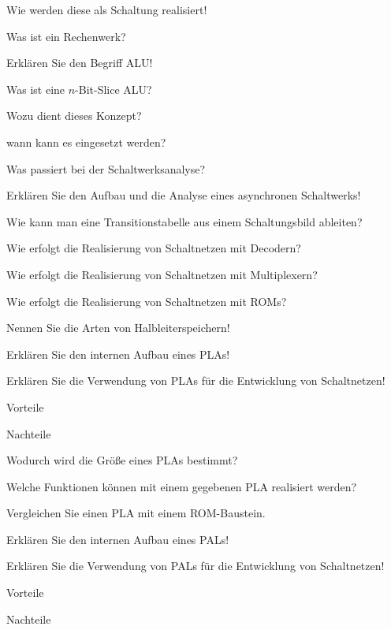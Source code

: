 \documentclass
[
  draft    = true,
  fontsize = 11pt,
  parskip  = half-,
  BCOR     = 0pt,
  DIV      = 11,
  ngerman,
  dvipsnames
]
{scrartcl}
\begin{document}
\begin{mytemize}
\begin{mytemize}
          \item Wie werden diese als Schaltung realisiert!
        \end{mytemize}
  \item Was ist ein Rechenwerk?
  \item Erklären Sie den Begriff ALU!
  \item Was ist eine $n$-Bit-Slice ALU?
        \begin{mytemize}
          \item Wozu dient dieses Konzept?
          \item wann kann es eingesetzt werden?
        \end{mytemize}
  \item Was passiert bei der Schaltwerksanalyse?
  \item Erklären Sie den Aufbau und die Analyse eines asynchronen Schaltwerks!
  \item Wie kann man eine Transitionstabelle aus einem Schaltungsbild ableiten?
  \item Wie erfolgt die Realisierung von Schaltnetzen mit Decodern?
  \item Wie erfolgt die Realisierung von Schaltnetzen mit Multiplexern?
  \item Wie erfolgt die Realisierung von Schaltnetzen mit ROMs?
  \item Nennen Sie die Arten von Halbleiterspeichern!
  \item Erklären Sie den internen Aufbau eines PLAs!
  \item Erklären Sie die Verwendung von PLAs für die Entwicklung von Schaltnetzen!
        \begin{mytemize}
          \item Vorteile
          \item Nachteile
        \end{mytemize}
  \item Wodurch wird die Größe eines PLAs bestimmt?
  \item Welche Funktionen können mit einem gegebenen PLA realisiert werden?
  \item Vergleichen Sie einen PLA mit einem ROM-Baustein.
  \item Erklären Sie den internen Aufbau eines PALs!
  \item Erklären Sie die Verwendung von PALs für die Entwicklung von Schaltnetzen!
        \begin{mytemize}
          \item Vorteile
          \item Nachteile

\end{mytemize}
\end{mytemize}
\end{document}
